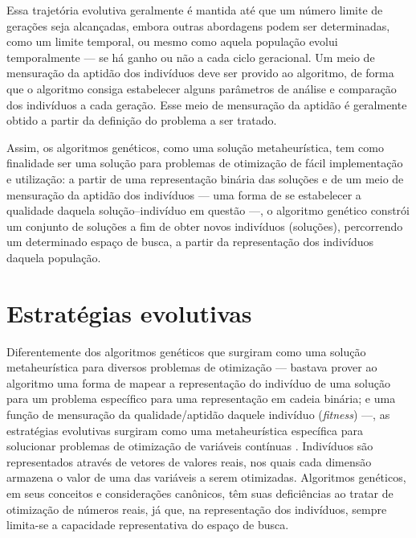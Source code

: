 \documentclass[relatorio,nocolorlinks]{inf-ufg}
\begin{document}
Essa trajet\'{o}ria evolutiva geralmente \'{e} mantida at\'{e} que um n\'{u}mero limite de gera\c{c}\~{o}es seja alcan\c{c}adas, embora outras
abordagens podem ser determinadas, como um limite temporal, ou mesmo como aquela popula\c{c}\~{a}o evolui temporalmente --- se h\'{a} ganho
ou n\~{a}o a cada ciclo geracional. Um meio de mensura\c{c}\~{a}o da aptid\~{a}o dos indiv\'{i}duos deve ser provido ao algoritmo, de forma que
o algoritmo consiga estabelecer alguns par\^{a}metros de an\'{a}lise e compara\c{c}\~{a}o dos indiv\'{i}duos a cada gera\c{c}\~{a}o. Esse meio
de mensura\c{c}\~{a}o da aptid\~{a}o \'{e} geralmente obtido a partir da defini\c{c}\~{a}o do problema a ser tratado.

Assim, os algoritmos gen\'{e}ticos, como uma solu\c{c}\~{a}o metaheur\'{i}stica, tem como finalidade ser uma solu\c{c}\~{a}o para problemas de
otimiza\c{c}\~{a}o de f\'{a}cil implementa\c{c}\~{a}o e utiliza\c{c}\~{a}o: a partir de uma representa\c{c}\~{a}o bin\'{a}ria das solu\c{c}\~{o}es
e de um meio de mensura\c{c}\~{a}o da aptid\~{a}o dos indiv\'{i}duos --- uma forma de se estabelecer a qualidade daquela
solu\c{c}\~{a}o--indiv\'{i}duo em quest\~{a}o ---, o algoritmo gen\'{e}tico constr\'{o}i um conjunto de solu\c{c}\~{o}es a fim de obter novos
indiv\'{i}duos (solu\c{c}\~{o}es), percorrendo um determinado espa\c{c}o de busca, a partir da representa\c{c}\~{a}o dos indiv\'{i}duos daquela
popula\c{c}\~{a}o.

\section{Estrat\'{e}gias evolutivas}

Diferentemente dos algoritmos gen\'{e}ticos que surgiram como uma solu\c{c}\~{a}o metaheur\'{i}stica para diversos problemas de otimiza\c{c}\~{a}o
--- bastava prover ao algoritmo uma forma de mapear a representa\c{c}\~{a}o do indiv\'{i}duo de uma solu\c{c}\~{a}o para um problema espec\'{i}fico
para uma representa\c{c}\~{a}o em cadeia bin\'{a}ria; e uma fun\c{c}\~{a}o de mensura\c{c}\~{a}o da qualidade/aptid\~{a}o daquele indiv\'{i}duo
(\textit{fitness}) ---, as estrat\'{e}gias evolutivas surgiram como uma metaheur\'{i}stica espec\'{i}fica para solucionar problemas de
otimiza\c{c}\~{a}o de vari\'{a}veis cont\'{i}nuas \cite{DeJong2006}. Indiv\'{i}duos s\~{a}o representados atrav\'{e}s de vetores de valores reais,
nos quais cada dimens\~{a}o armazena o valor de uma das vari\'{a}veis a serem otimizadas. Algoritmos gen\'{e}ticos, em seus conceitos e
considera\c{c}\~{o}es can\^{o}nicos, t\^{e}m suas defici\^{e}ncias ao tratar de otimiza\c{c}\~{a}o de n\'{u}meros reais, j\'{a} que, na
representa\c{c}\~{a}o dos indiv\'{i}duos, sempre limita-se a capacidade representativa do espa\c{c}o de busca.
\end{document}
